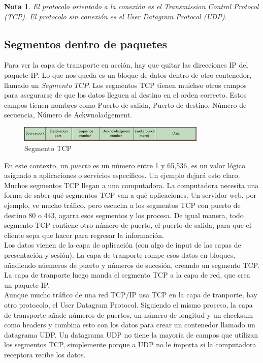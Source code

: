 \documentclass[12pt]{report}
\newtheorem{nota}{Nota}
\begin{document}
\begin{nota}
El protocolo orientado a la conexión es el Transmission Control Protocol (TCP).
El protocolo sin conexión es el User Datagram Protocol (UDP).
\end{nota}

\subsection{Segmentos dentro de paquetes}
Para ver la capa de transporte en acción, hay que quitar las direcciones IP
del paquete IP. Lo que nos queda es un bloque de datos dentro de otro contenedor,
llamado un $\textit{Segmento TCP}$. Los segmentos TCP tienen muichso otros campos
para asegurarse de que los datos lleguen al destino en el orden correcto.
Estos campos tienen nombres como Puerto de salida, Puerto de destino,
Número de secuencia, Número de Ackwnoladgement.

\begin{figure}[h]
\centering
\includegraphics[width=0.8\textwidth]{Segmento.png}
\caption{Segmento TCP}
\end{figure}

En este contexto, un $\textit{puerto}$ es un número entre 1 y 65,536,
es un valor lógico asignado a aplicaciones o servicios específicos.
Un ejemplo dejará esto claro. Muchos segmentos TCP llegan a una computadora.
La computadora necesita una forma de saber qué segmentos TCP van a qué aplicaciones.
Un servidor web, por ejemplo, ve mucho tráfico, pero escucha a los segmentos TCP
con puerto de destino 80 o 443, agarra esos segmentos y los procesa.
De igual manera, todo segmento TCP contiene otro número de puerto, el puerto de salida,
para que el cliente sepa que hacer para regresar la información.\\
Los datos vienen de la capa de aplicación (con algo de input de las capas
de presentación y sesión). La capa de tranporte rompe esos datos en bloques,
añadiendo núemeros de puerto y números de sucesión, creando un segmento TCP.
La capa de tranporte luego manda el segmento TCP a la capa de red, que crea un paquete
IP.\\
Aunque mucho tráfico de una red TCP/IP usa TCP en la capa de tranporte, 
hay otro protocolo, el User Datagram Protocol. Siguiendo el mismo proceso,
la capa de transporte añade números de puertos, un número de longitud y 
un checksum como headers y combina esto con los datos para crear un contenedor
llamado un datagrama UDP. Un datagrama UDP no tiene la mayoría de campos
que utilizan los segmentos TCP, simplemente porque a UDP no le importa 
si la computadora receptora recibe los datos.
\end{document}

